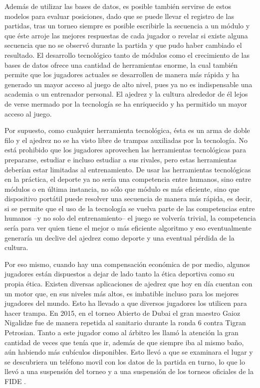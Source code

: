 \documentclass[twoside,openright,12pt,a4paper,spanish]{book}
\begin{document}
Además de utilizar las bases de datos, es posible también servirse de estos modelos para evaluar posiciones, dado que se puede llevar el registro de las partidas, tras un torneo siempre es posible escribirle la secuencia a un módulo y que éste arroje las mejores respuestas de cada jugador o revelar si existe alguna secuencia que no se observó durante la partida y que pudo haber cambiado el resultado. El desarrollo tecnológico tanto de módulos como el crecimiento de las bases de datos ofrece una cantidad de herramientas enorme, la cual también permite que los jugadores actuales se desarrollen de manera más rápida y ha generado un mayor acceso al juego de alto nivel, pues ya no es indispensable una academia o un entrenador personal. El ajedrez y la cultura alrededor de \'el lejos de verse mermado por la tecnolog\'ia se ha enriquecido y ha permitido un mayor acceso al juego.

Por supuesto, como cualquier herramienta tecnológica, \'esta es un arma de doble filo y el ajedrez no se ha visto libre de trampas auxiliadas por la tecnología. No está prohibido que los jugadores aprovechen las herramientas tecnológicas para prepararse, estudiar e incluso estudiar a sus rivales, pero estas herramientas deberían estar limitadas al entrenamiento. De usar las herramientas tecnol\'ogicas en la pr\'actica, el deporte ya no ser\'ia una competencia entre humanos, sino entre m\'odulos o en \'ultima instancia, no s\'olo que m\'odulo es m\'as eficiente, sino que dispositivo portátil puede resolver una secuencia de manera m\'as r\'apida, es decir, si se permite que el uso de la tecnología se vuelva parte de las competencias entre humanos --y no solo del entrenamiento-- el juego se volvería trivial, la competencia sería para ver quien tiene el mejor o más eficiente algoritmo y eso eventualmente generaría un declive del ajedrez como deporte y una eventual pérdida de la cultura.

Por eso mismo, cuando hay una compensaci\'on econ\'omica de por medio, algunos jugadores est\'an dispuestos a dejar de lado tanto la \'etica deportiva como su propia \'etica. Existen diversas aplicaciones de ajedrez que hoy en d\'ia cuentan con un motor que, en sus niveles m\'as altos, es imbatible incluso para los mejores jugadores del mundo. Esto ha llevado a que diversos jugadores los utilicen para hacer trampa. En 2015, en el torneo Abierto de Dubai el gran maestro Gaioz Nigalidze fue de manera repetida al sanitario durante la ronda 6 contra Tigran Petrosian. Tanto a este jugador como al árbitro les llam\'o la atenci\'on la gran cantidad de veces que ten\'ia que ir, adem\'as de que siempre iba al mismo ba\~no, a\'un habiendo m\'as cubículos disponibles. Esto llev\'o a que se examinara el lugar y se descubriera un tel\'efono movil con los datos de la partida en turno, lo que lo llev\'o a una suspensi\'on del torneo y a una suspensi\'on de los torneos oficiales de la FIDE \cite{gm_haciendotrampa}.
\end{document}
